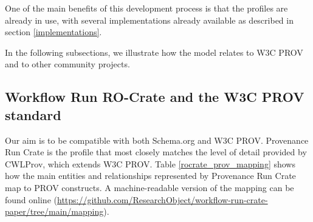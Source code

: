 \documentclass[10pt,letterpaper]{article}
\begin{document}
One of the main benefits of this development process is that the profiles are already in use, with several implementations already available as described in section \ref{implementations}.

In the following subsections, we illustrate how the model relates to W3C PROV and to other community projects.

\subsection{Workflow Run RO-Crate and the W3C PROV standard}

Our aim is to be compatible with both Schema.org and W3C PROV. Provenance Run Crate is the profile that most closely matches the level of detail provided by CWLProv, which extends W3C PROV. Table \ref{rocrate_prov_mapping} shows how the main entities and relationships represented by Provenance Run Crate map to PROV constructs. A machine-readable version of the mapping can be found online (\url{https://github.com/ResearchObject/workflow-run-crate-paper/tree/main/mapping}).
\end{document}

